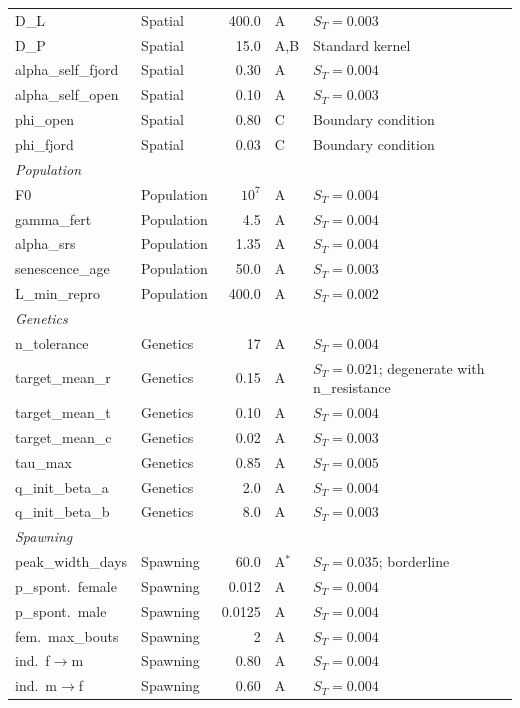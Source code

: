 \documentclass[11pt,a4paper]{article}
\begin{document}
\begin{footnotesize}
\begin{longtable}{llrlp{5.5cm}}
\midrule
D\_L & Spatial & 400.0 & A & $S_T = 0.003$ \\
D\_P & Spatial & 15.0 & A,B & Standard kernel \\
alpha\_self\_fjord & Spatial & 0.30 & A & $S_T = 0.004$ \\
alpha\_self\_open & Spatial & 0.10 & A & $S_T = 0.003$ \\
phi\_open & Spatial & 0.80 & C & Boundary condition \\
phi\_fjord & Spatial & 0.03 & C & Boundary condition \\
\midrule
\multicolumn{5}{l}{\textit{Population}} \\
\midrule
F0 & Population & $10^7$ & A & $S_T = 0.004$ \\
gamma\_fert & Population & 4.5 & A & $S_T = 0.004$ \\
alpha\_srs & Population & 1.35 & A & $S_T = 0.004$ \\
senescence\_age & Population & 50.0 & A & $S_T = 0.003$ \\
L\_min\_repro & Population & 400.0 & A & $S_T = 0.002$ \\
\midrule
\multicolumn{5}{l}{\textit{Genetics}} \\
\midrule
n\_tolerance & Genetics & 17 & A & $S_T = 0.004$ \\
target\_mean\_r & Genetics & 0.15 & A & $S_T = 0.021$; degenerate with n\_resistance \\
target\_mean\_t & Genetics & 0.10 & A & $S_T = 0.004$ \\
target\_mean\_c & Genetics & 0.02 & A & $S_T = 0.003$ \\
tau\_max & Genetics & 0.85 & A & $S_T = 0.005$ \\
q\_init\_beta\_a & Genetics & 2.0 & A & $S_T = 0.004$ \\
q\_init\_beta\_b & Genetics & 8.0 & A & $S_T = 0.003$ \\
\midrule
\multicolumn{5}{l}{\textit{Spawning}} \\
\midrule
peak\_width\_days & Spawning & 60.0 & A$^*$ & $S_T = 0.035$; borderline \\
p\_spont.\ female & Spawning & 0.012 & A & $S_T = 0.004$ \\
p\_spont.\ male & Spawning & 0.0125 & A & $S_T = 0.004$ \\
fem.\ max\_bouts & Spawning & 2 & A & $S_T = 0.004$ \\
ind.\ f$\to$m & Spawning & 0.80 & A & $S_T = 0.004$ \\
ind.\ m$\to$f & Spawning & 0.60 & A & $S_T = 0.004$ \\

\end{longtable}
\end{footnotesize}
\end{document}
